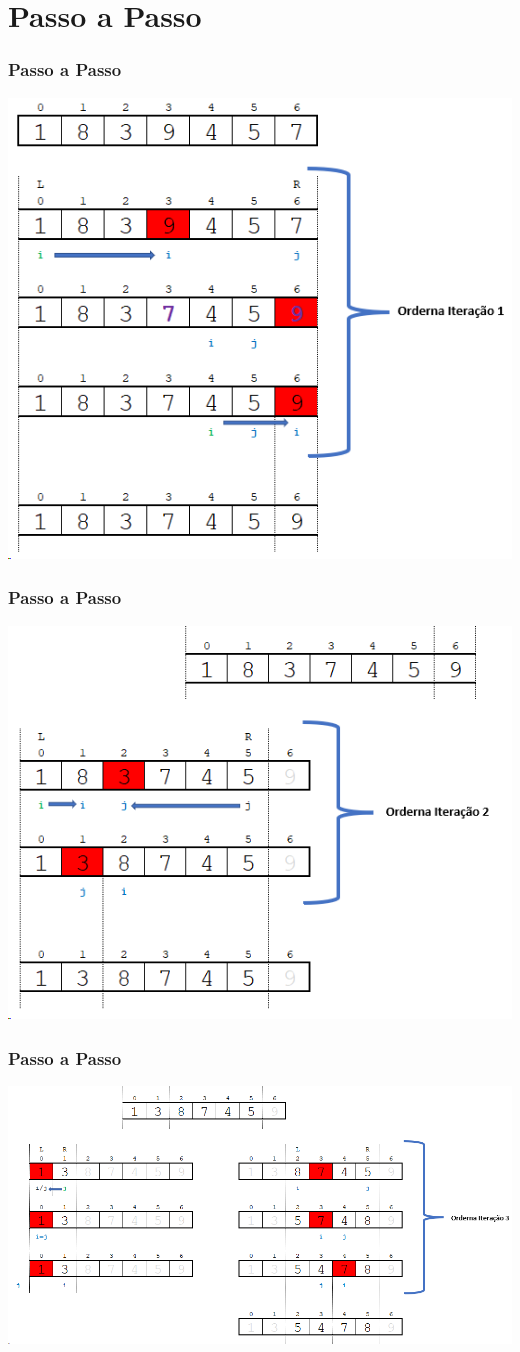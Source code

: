 \documentclass[
	11pt, %
]{beamer}
\begin{document}
\section{Passo a Passo} 
\begin{frame}
	\frametitle{Passo a Passo}
	\includegraphics[width=0.8\linewidth]{o1}
\end{frame}
\begin{frame}
	\frametitle{Passo a Passo}
	\includegraphics[width=0.8\linewidth]{o2}
\end{frame}
\begin{frame}
	\frametitle{Passo a Passo}
	\includegraphics[width=0.8\linewidth]{o3}
\end{frame}
\end{document}
